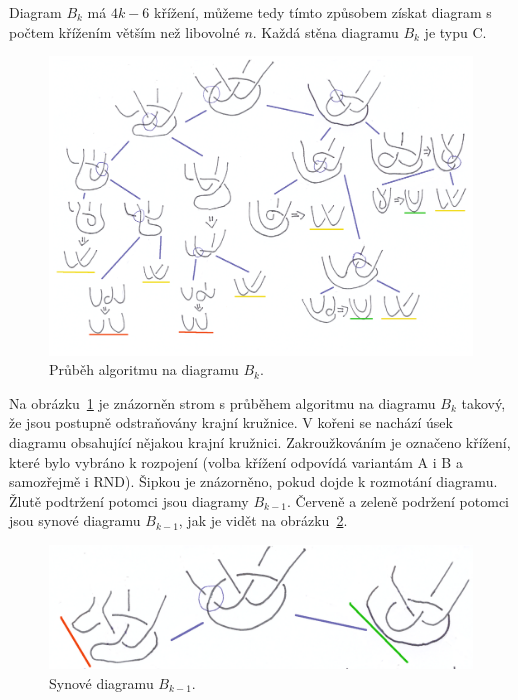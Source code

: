 \begin{dukaz}
Diagram $B_k$ má $4k-6$ křížení, můžeme tedy tímto způsobem získat diagram s počtem křížením větším než libovolné $n$. Každá stěna diagramu $B_k$ je typu C.

\begin{figure}[p] \centering
\includegraphics[scale=0.45]{../img/horniodhad}
\caption{Průběh algoritmu na diagramu $B_k$.} \label{prubehhorni}
\end{figure}

Na obrázku~\ref{prubehhorni} je znázorněn strom s průběhem algoritmu na diagramu $B_k$ takový, že jsou postupně odstraňovány krajní kružnice. V kořeni se nachází úsek diagramu obsahující nějakou krajní kružnici. Zakroužkováním je označeno křížení, které bylo vybráno k rozpojení (volba křížení odpovídá variantám A i B a samozřejmě i RND). Šipkou je znázorněno, pokud dojde k rozmotání diagramu. Žlutě podtržení potomci jsou diagramy $B_{k-1}$. Červeně a zeleně podržení potomci jsou synové diagramu $B_{k-1}$, jak je vidět na obrázku~\ref{rozdvojeni}.

\begin{figure}[p] \centering
\includegraphics[scale=0.3]{../img/rozdvojeni}
\caption{Synové diagramu $B_{k-1}$.}  \label{rozdvojeni}
\end{figure}


\end{dukaz}
